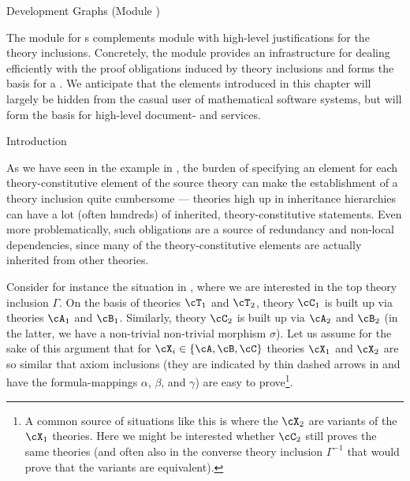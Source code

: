 \begin{omgroup}[id=complex-theories,short=Complex Theories,
                            creators=miko,contributors=frabe]
\begin{omgroup}[id=development-graphs,short=Development Graphs]{Development Graphs (Module
  {})}
\begin{module}[id=dgraph]
  
The \omdoc module {} for {s} complements
module {} with high-level justifications for the theory inclusions.
Concretely, the module provides an infrastructure for dealing efficiently with the proof
obligations induced by theory inclusions and forms the basis for a
. We anticipate that the elements
introduced in this chapter will largely be hidden from the casual user of mathematical
software systems, but will form the basis for high-level document- and
{} services.

\begin{omgroup}[id=dg-intro,short=Introduction]{Introduction}

As we have seen in the example in {}, the burden of specifying
an  element for each theory-constitutive element of the source
theory can make the establishment of a theory inclusion quite cumbersome --- theories high
up in inheritance hierarchies can have a lot (often hundreds) of inherited,
theory-constitutive statements.  Even more problematically, such obligations are a source
of redundancy and non-local dependencies, since many of the theory-constitutive elements
are actually inherited from other theories.
  
  Consider for instance the situation in {}, where we are interested
  in the top theory inclusion $\Gamma$. On the basis of theories $\cT_1$ and $\cT_2$,
  theory $\cC_1$ is built up via theories $\cA_1$ and $\cB_1$.  Similarly, theory $\cC_2$
  is built up via $\cA_2$ and $\cB_2$ (in the latter, we have a non-trivial non-trivial
  morphism $\sigma$).  Let us assume for the sake of this argument that for
  $\cX_i\in\{\cA,\cB,\cC\}$ theories $\cX_1$ and $\cX_2$ are so similar that axiom
  inclusions (they are indicated by thin dashed arrows in {} and have
  the formula-mappings $\alpha$, $\beta$, and $\gamma$) are easy to prove\footnote{A
    common source of situations like this is where the $\cX_2$ are variants of the $\cX_1$
    theories. Here we might be interested whether $\cC_2$ still proves the same theories
    (and often also in the converse theory inclusion $\Gamma^{-1}$ that would prove that
    the variants are equivalent).}.


\end{omgroup}
\end{module}
\end{omgroup}
\end{omgroup}
